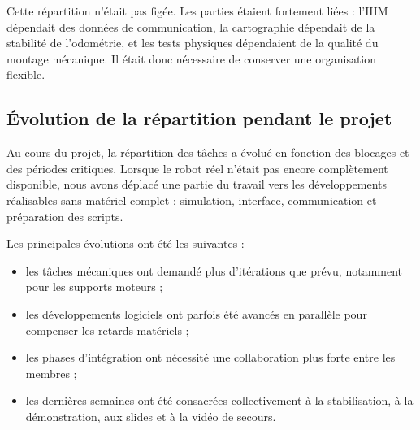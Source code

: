 \documentclass[11pt,a4paper]{report}
\begin{document}
Cette répartition n'était pas figée. Les parties étaient fortement liées : l'IHM dépendait des données de communication, la cartographie dépendait de la stabilité de l'odométrie, et les tests physiques dépendaient de la qualité du montage mécanique. Il était donc nécessaire de conserver une organisation flexible.

\subsection{Évolution de la répartition pendant le projet}

Au cours du projet, la répartition des tâches a évolué en fonction des blocages et des périodes critiques. Lorsque le robot réel n'était pas encore complètement disponible, nous avons déplacé une partie du travail vers les développements réalisables sans matériel complet : simulation, interface, communication et préparation des scripts.

Les principales évolutions ont été les suivantes :
\begin{itemize}
    \item les tâches mécaniques ont demandé plus d'itérations que prévu, notamment pour les supports moteurs ;
    \item les développements logiciels ont parfois été avancés en parallèle pour compenser les retards matériels ;
    \item les phases d'intégration ont nécessité une collaboration plus forte entre les membres ;
    \item les dernières semaines ont été consacrées collectivement à la stabilisation, à la démonstration, aux slides et à la vidéo de secours.
\end{itemize}
\end{document}
